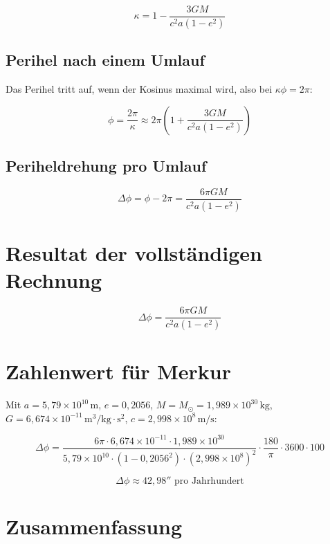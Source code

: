 \[
\kappa = 1 - \frac{3GM}{c^2 a(1-e^2)}
\]

\subsection{Perihel nach einem Umlauf}
\label{sub:periheldrehung_perihel_umlauf}

Das Perihel tritt auf, wenn der Kosinus maximal wird, also bei \( \kappa \phi = 2\pi \):

\[
\phi = \frac{2\pi}{\kappa} \approx 2\pi \left(1 + \frac{3GM}{c^2 a(1-e^2)}\right)
\]

\subsection{Periheldrehung pro Umlauf}
\label{sub:periheldrehung_formel}

\[
\Delta\phi = \phi - 2\pi = \frac{6\pi GM}{c^2 a(1-e^2)}
\]

\section{Resultat der vollständigen Rechnung}
\label{app:periheldrehung_resultat}

\[
\boxed{\Delta\phi = \frac{6\pi GM}{c^2 a(1-e^2)}}
\]

\section{Zahlenwert für Merkur}
\label{app:periheldrehung_merkur}

Mit \( a = 5,79 \times 10^{10} \, \text{m} \), \( e = 0,2056 \), \( M = M_{\odot} = 1,989 \times 10^{30} \, \text{kg} \), \( G = 6,674 \times 10^{-11} \, \text{m}^3/\text{kg}\cdot\text{s}^2 \), \( c = 2,998 \times 10^8 \, \text{m/s} \):

\[
\Delta\phi = \frac{6\pi \cdot 6,674 \times 10^{-11} \cdot 1,989 \times 10^{30}}
{5,79 \times 10^{10} \cdot (1 - 0,2056^2) \cdot (2,998 \times 10^8)^2} 
\cdot \frac{180}{\pi} \cdot 3600 \cdot 100
\]

\[
\Delta\phi \approx 42,98'' \text{ pro Jahrhundert}
\]

\section{Zusammenfassung}
\label{app:periheldrehung_zusammenfassung}

